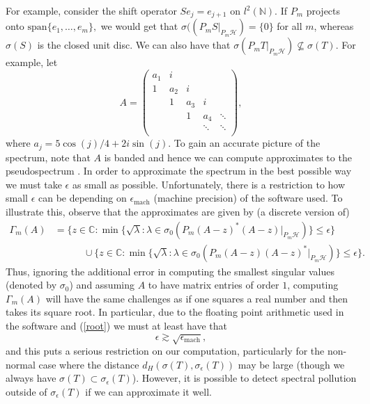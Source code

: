 \documentclass[a4paper,10pt]{article}
\begin{document}
For example, consider the shift operator $Se_j = e_{j+1}$ on $l^2(\mathbb{N})$. If $P_m$ projects onto $\mathrm{span} \{e_1,\hdots,e_m\},$ we would get that $\sigma((P_mS |_{P_m\mathcal{H}}) = \{0\}$ for all $m$, whereas $\sigma(S)$ is the closed unit disc. We can also have that $\sigma(P_mT |_{P_m\mathcal{H}}) \nsubseteq \sigma(T).$ For example, let
\begin{equation}\label{eq:the_A}
A = \left(
\begin{matrix}
 a_1      & i     &        &       &       \\
 1     & a_2     & i  &  &   \\
      & 1     & a_3       & i      &   \\
      &      & 1       & a_4      &  \ddots \\
  &   &  & \ddots & \ddots\\
\end{matrix}
\right),
\end{equation}
where $a_j=5\cos(j)/4+2i\sin(j)$. To gain an accurate picture of the spectrum, note that $A$ is banded and hence we can compute approximates to the pseudospectrum \cite{hansen2011}. In order to approximate the spectrum in the best possible way we must take $\epsilon$ as small as possible. Unfortunately, there is a restriction to how small $\epsilon$ can be depending on $\epsilon_{\mathrm{mach}}$ (machine precision) of the software used. To illustrate this, observe that the approximates are given by (a discrete version of)
\begin{equation}\label{root}
\begin{split}
\Gamma_{m}(A) &= \{z \in \mathbb{C}
: \min \{ \sqrt{\lambda} : \lambda \in \sigma_0(P_{m}(A -
  z)^*(A - z)\vert_{P_{m}\mathcal{H}})\} \leq \epsilon\}
\\& \qquad \quad \cup  \{z \in \mathbb{C}
: \min \{ \sqrt{\lambda} : \lambda \in \sigma_0(P_{m}(A -
  z)(A - z)^*\vert_{P_{m}\mathcal{H}})\} \leq \epsilon\}.
\end{split}
\end{equation}
Thus, ignoring the additional error in computing the smallest singular values (denoted by $\sigma_0$) and assuming $A$ to have matrix entries of order $1$, computing $\Gamma_{m}(A)$ will have the same challenges as if one squares a real number and then takes its square root. In particular, due to the floating point arithmetic used in the software and (\ref{root}) we must at least have that 
$$
\epsilon \gtrsim \sqrt{\epsilon_{\mathrm{mach}}},
$$
and this puts a serious restriction on our computation, particularly for the non-normal case where the distance $d_H(\sigma(T),\sigma_{\epsilon}(T))$ may be large (though we always have $\sigma(T)\subset\sigma_{\epsilon}(T)$). However, it is possible to detect spectral pollution outside of $\sigma_{\epsilon}(T)$ if we can approximate it well.
\end{document}
